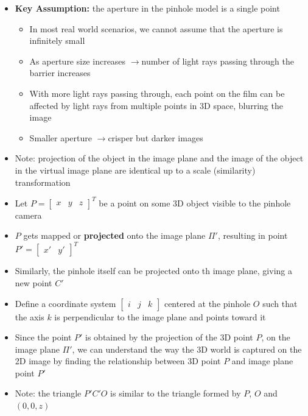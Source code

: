 \documentclass[letterpaper,12pt]{article}
\newcommand{\lra}{\ensuremath{\longrightarrow{}}}
\begin{document}
\begin{itemize}
 \item \textbf{Key Assumption:} the aperture in the pinhole model is a single point
       \begin{itemize}
        \item In most real world scenarios, we cannot assume that the aperture is infinitely small
        \item As aperture size increases \lra number of light rays passing through the barrier increases
        \item With more light rays passing through, each point on the film can be affected by light rays from multiple points in 3D space, blurring the image
        \item Smaller aperture \lra crisper but darker images
       \end{itemize}
 \item Note: projection of the object in the image plane and the image of the object in the virtual image plane are identical up to a scale (similarity) transformation
 \item Let $P = \begin{bmatrix}
         x & y & z
        \end{bmatrix}^T$ be a point on some 3D object visible to the pinhole camera
 \item $P$ gets mapped or \textbf{projected} onto the image plane $\Pi'$, resulting in point $P' = \begin{bmatrix}
         x' & y'
        \end{bmatrix}^T$
 \item Similarly, the pinhole itself can be projected onto th image plane, giving a new point $C'$
 \item Define a coordinate system $\begin{bmatrix}
         i & j & k
        \end{bmatrix}$ centered at the pinhole $O$ such that the axis $k$ is perpendicular to the image plane and points toward it
 \item Since the point $P'$ is obtained by the projection of the 3D point $P$,  on the image plane $\Pi'$, we can understand the way the 3D world is captured on the 2D image by finding the relationship between 3D point $P$ and image plane point $P'$
 \item Note: the triangle $P'C'O$ is similar to the triangle formed by $P$, $O$ and $(0,0,z)$
\end{itemize}
\end{document}
